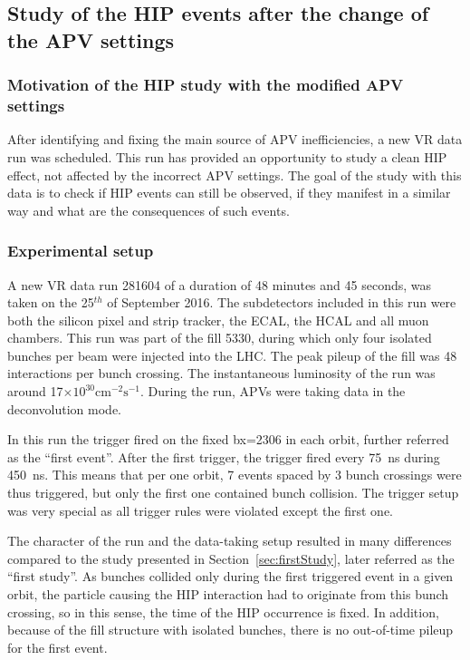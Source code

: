 \newpage

\subsection{Study of the HIP events after the change of the APV settings~\label{sec:secondStudy}}

\subsubsection{Motivation of the HIP study with the modified APV settings}

After identifying and fixing the main source of APV inefficiencies, a new VR data run was scheduled. This run has provided an opportunity to study a clean HIP effect, not affected by the incorrect APV settings. The goal of the study with this data is to check if HIP events can still be observed, if they manifest in a similar way and what are the consequences of such events.


\subsubsection{Experimental setup}

A new VR data run 281604 of a duration of 48 minutes and 45 seconds, was taken on the 25$^{th}$ of September 2016. The subdetectors included in this run were both the silicon pixel and strip tracker, the ECAL, the HCAL and all muon chambers. This run was part of the fill 5330, during which only four isolated bunches per beam were injected into the LHC. The peak pileup of the fill was 48 interactions per bunch crossing. The instantaneous luminosity of the run was around 17$\times 10^{30} \mathrm{cm^{-2} s^{-1}}$. During the run, APVs were taking data in the deconvolution mode. 

In this run the trigger fired on the fixed bx=2306 in each orbit, further referred as the ``first event''. After the first trigger, the trigger fired every 75~ns during 450~ns. This means that per one orbit, 7 events spaced by 3 bunch crossings were thus triggered, but only the first one contained bunch collision. The trigger setup was very special as all trigger rules were violated except the first one.


The character of the run and  the data-taking setup resulted in many differences compared to the study presented in Section~\ref{sec:firstStudy}, later referred as the ``first study''. As bunches collided only during the first triggered event in a given orbit, the particle causing the HIP interaction had to originate from this bunch crossing, so in this sense, the time of the HIP occurrence is fixed. In addition, because of the fill structure with isolated bunches, there is no out-of-time pileup for the first event.

